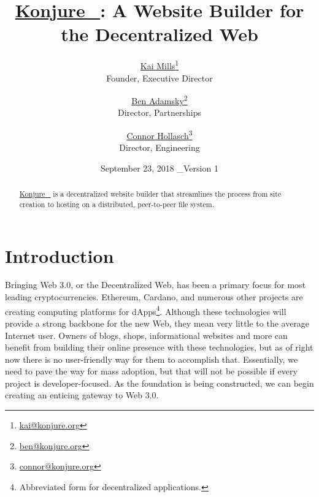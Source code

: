 \documentclass{article}
\def \version {Version 1}
\def \website {https://konjure.org}
\newcommand\tab[1][1cm]{\hspace*{#1}}
\newcommand{\konjure}{\href{\website}{Konjure\_\texttrademark}\xspace}
\newcommand{\kauthor}[3]{
	\href{mailto:#3}{#1}\footnote{ \href{mailto:#3}{#3}}
   	\\ \small{#2}
}
\begin{document}

\title{\textbf{\konjure}: A Website Builder for the Decentralized Web}

\author{
	\kauthor{Kai Mills}{Founder, Executive Director}{kai@konjure.org} \and
	\kauthor{Ben Adamsky}{Director, Partnerships}{ben@konjure.org} \and
	\kauthor{Connor Hollasch}{Director, Engineering}{connor@konjure.org}
}

\date{September 23, 2018 \_\textemdash \version}

\maketitle


\begin{abstract}
\konjure is a decentralized website builder that streamlines the process from site creation to hosting on a distributed, peer-to-peer file system. \currfileabsdir
\end{abstract}


\tableofcontents
\cleardoublepage
\newpage



\section{Introduction}

\tab Bringing Web 3.0, or the Decentralized Web, has been a primary focus for most leading cryptocurrencies. Ethereum, Cardano, and numerous other projects are creating computing platforms for dApps\footnote{Abbreviated form for decentralized applications.}. Although these technologies will provide a strong backbone for the new Web, they mean very little to the average Internet user.
Owners of blogs, shops, informational websites and more can benefit from building their online presence with these technologies, but as of right now there is no user-friendly way for them to accomplish that. Essentially, we need to pave the way for mass adoption, but that will not be possible if every project is developer-focused. As the foundation is being constructed, we can begin creating an enticing gateway to Web 3.0.
\end{document}
